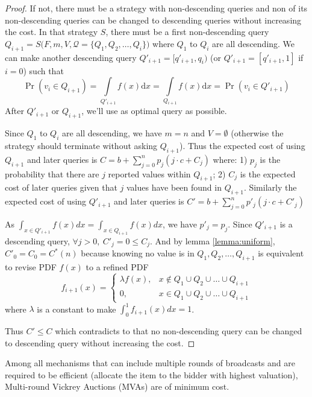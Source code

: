 \begin{proof}

If not, there must be a strategy with non-descending queries and non of its
non-descending queries can be changed to descending queries without increasing
the cost. In that strategy $S$, there must be a first non-descending query
$Q_{i+1} = S\big(F, m, V, \mathcal Q = \{Q_1, Q_2, \ldots, Q_i\}\big)$ where
$Q_1$ to $Q_i$ are all descending.  We can make another descending query
$Q'_{i+1} = [q'_{i+1}, q_i)$ (or $Q'_{i+1} = [q'_{i+1}, 1]$ if $i = 0$) such
that 
\[ 
\Pr(v_i \in Q_{i+1}) = \int \limits_{Q'_{i+1}} f(x) \mathrm d x = \int \limits_{Q_{i+1}} f(x) \mathrm d x = \Pr(v_i \in Q'_{i+1})
\]
After $Q'_{i+1}$ or $Q_{i+1}$, we'll use as optimal query as
possible.

Since $Q_1$ to $Q_i$ are all descending, we have $m = n$ and $V = \emptyset$ (otherwise
the strategy should terminate without asking $Q_{i+1}$).
Thus the expected cost of using $Q_{i+1}$ and later queries is
$
C = b + \sum_{j=0}^n p_j ( j \cdot c + C_j)
$
where: 1) $p_j$ is the probability that there are $j$ reported values within $Q_{i+1}$;
2) $C_j$ is the expected cost of later queries given that $j$ values have been
found in $Q_{i+1}$. Similarly the expected cost of using $Q'_{i+1}$ and later queries is
$
C' = b + \sum_{j=0}^n p'_j ( j \cdot c + C'_j)
$

As $ \int_{x \in Q'_{i+1}}
f(x) dx = \int_{x \in Q_{i+1}} f(x) dx $, we have $p'_j = p_j$. Since $Q'_{i+1}$ is a
descending query, $\forall j > 0, ~C'_j = 0 \leq C_j$. And by lemma \ref{lemma:uniform},
$C'_0 = C_0 = C^*(n)$ because knowing no value is in $Q_1, Q_2, \ldots, Q_{i+1}$ is equivalent
to revise PDF $f(x)$ to a refined PDF 
\[
f_{i+1}(x) = \begin{cases}
	\lambda f(x), & x \notin Q_1 \cup Q_2 \cup \ldots \cup Q_{i+1} \\
	0, & x \in Q_1 \cup Q_2 \cup \ldots \cup Q_{i+1}
\end{cases}
\]
where $\lambda$ is a constant to make $\int_0^1 f_{i+1}(x) dx = 1$.

Thus $C' \leq C$ which contradicts to that no non-descending query can be changed to
descending query without increasing the cost.

\end{proof}

\begin{theorem}\label{theorem1}

Among all mechanisms that can include multiple rounds of broadcasts and are
required to be efficient (allocate the item to the bidder with highest
valuation), Multi-round Vickrey Auctions (MVAs) are of minimum cost.

\end{theorem}

